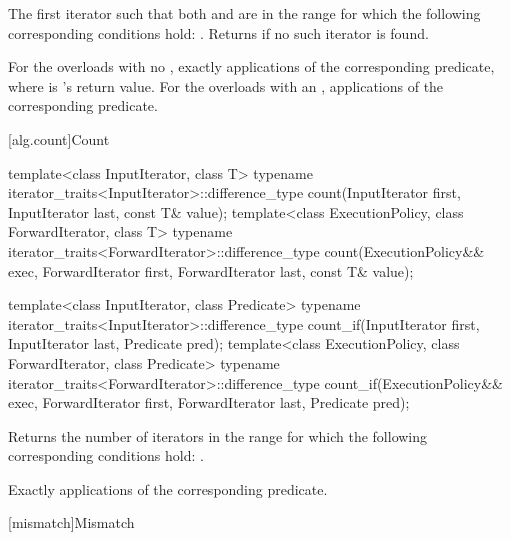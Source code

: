 \begin{itemdescr}
\pnum
\returns
The first iterator
such that both
and
are in
the range
for which
the following corresponding conditions hold:
.
Returns 
if no such iterator is found.

\pnum
\complexity
For the overloads with no , exactly
applications of the corresponding predicate, where  is
's
return value.  For the overloads with an ,
 applications of the corresponding predicate.
\end{itemdescr}

[alg.count]{Count}

%
%
\begin{itemdecl}
template<class InputIterator, class T>
  typename iterator_traits<InputIterator>::difference_type
     count(InputIterator first, InputIterator last, const T& value);
template<class ExecutionPolicy, class ForwardIterator, class T>
  typename iterator_traits<ForwardIterator>::difference_type
    count(ExecutionPolicy&& exec, ForwardIterator first, ForwardIterator last, const T& value);

template<class InputIterator, class Predicate>
  typename iterator_traits<InputIterator>::difference_type
    count_if(InputIterator first, InputIterator last, Predicate pred);
template<class ExecutionPolicy, class ForwardIterator, class Predicate>
  typename iterator_traits<ForwardIterator>::difference_type
    count_if(ExecutionPolicy&& exec, ForwardIterator first, ForwardIterator last, Predicate pred);
\end{itemdecl}

\begin{itemdescr}
\pnum
\effects
Returns the number of iterators
in the range 
for which the following corresponding
conditions hold:
.

\pnum
\complexity
Exactly
applications of the corresponding predicate.
\end{itemdescr}

[mismatch]{Mismatch}

